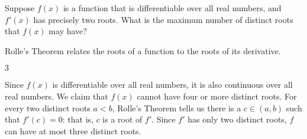 \begin{Mquestion}
Suppose $f(x)$ is a function that is differentiable over all real numbers, and $f'(x)$ has precisely two roots. What is the maximum number of distinct roots that $f(x)$ may have?
\end{Mquestion}
\begin{hint}
Rolle's Theorem relates the roots of a function to the roots of its derivative.
\end{hint}
\begin{answer}
$3$
\end{answer}
\begin{solution}
Since $f(x)$ is differentiable over all real numbers, it is also continuous over all real numbers. We claim that $f(x)$ cannot have four or more distinct roots. For every two distinct roots $a<b$, Rolle's Theorem tells us there is a $c \in (a,b)$ such that $f'(c)=0$: that is, $c$ is a root of $f'$. Since $f'$ has only two distinct roots, $f$ can have at most three distinct roots.

\begin{center}
\end{center}
\end{solution}



